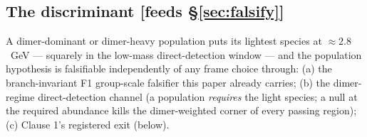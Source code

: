 \subsection{The discriminant [feeds \S\ref{sec:falsify}]}
A dimer-dominant or dimer-heavy population puts its lightest species at
$\approx 2.8$~GeV --- squarely in the low-mass direct-detection window --- and
the population hypothesis is falsifiable independently of any frame choice
through: (a) the branch-invariant F1 group-scale falsifier this paper already
carries; (b) the dimer-regime direct-detection channel (a population
\emph{requires} the light species; a null at the required abundance kills the
dimer-weighted corner of every passing region); (c) Clause 1's registered exit
(below). %

